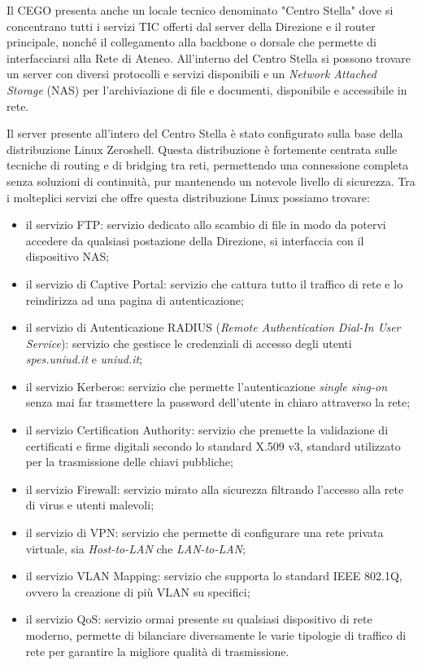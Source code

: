             \par
                Il CEGO presenta anche un locale tecnico denominato "Centro Stella" dove si concentrano tutti i servizi TIC offerti dal server della Direzione e il router principale, nonché il collegamento alla backbone o dorsale che permette di interfacciarsi alla Rete di Ateneo. \newline
                All'interno del Centro Stella si possono trovare un server con diversi protocolli e servizi disponibili e un  \textit{Network Attached Storage} (NAS) per l'archiviazione di file e documenti, disponibile e accessibile in rete. 
            \par
                Il server presente all'intero del Centro Stella è stato configurato sulla base della distribuzione Linux Zeroshell. 
                Questa distribuzione è fortemente centrata sulle tecniche di routing e di bridging tra reti, permettendo una connessione completa senza soluzioni di continuità, pur mantenendo un notevole livello di sicurezza. \newline
                Tra i molteplici servizi che offre questa distribuzione Linux possiamo trovare: 
                \begin{itemize}
                    \item il servizio FTP: servizio dedicato allo scambio di file in modo da potervi accedere da qualsiasi postazione della Direzione, si interfaccia con il dispositivo NAS;
                    \item il servizio di Captive Portal: servizio che cattura tutto il traffico di rete e lo reindirizza ad una pagina  di autenticazione;
                    \item il servizio di Autenticazione RADIUS (\textit{Remote Authentication Dial-In User Service}): servizio che gestisce le credenziali di accesso degli utenti \emph{spes.uniud.it} e \emph{uniud.it};
                    \item il servizio Kerberos: servizio che permette l'autenticazione \textit{single sing-on} senza mai far trasmettere la password dell'utente in chiaro attraverso la rete;
                    \item il servizio Certification Authority: servizio che premette la validazione di certificati e firme digitali secondo lo standard X.509 v3, standard utilizzato per la trasmissione delle chiavi pubbliche;
                    \item il servizio Firewall: servizio mirato alla sicurezza filtrando l'accesso alla rete di virus e utenti malevoli;
                    \item il servizio di VPN: servizio che permette di configurare una rete privata virtuale, sia \textit{Host-to-LAN} che \textit{LAN-to-LAN};
                    \item il servizio VLAN Mapping: servizio che supporta lo standard IEEE 802.1Q, ovvero la creazione di più VLAN su specifici; 
                    \item il servizio QoS: servizio ormai presente su qualsiasi dispositivo di rete moderno, permette di bilanciare diversamente le varie tipologie di traffico di rete per garantire la migliore qualità di trasmissione. 
                \end{itemize}
